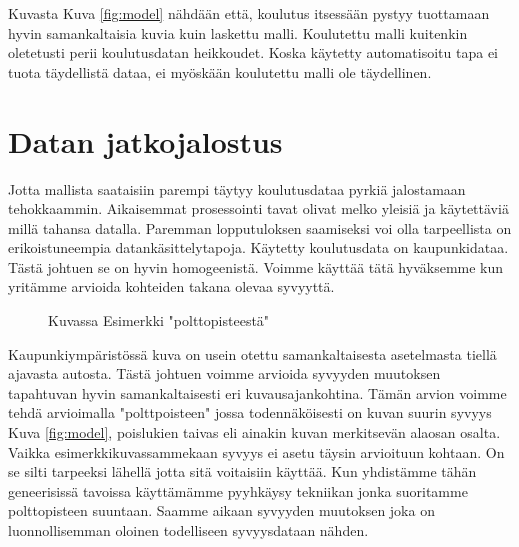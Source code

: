 Kuvasta Kuva \ref{fig:model}  nähdään että, koulutus itsessään pystyy tuottamaan hyvin samankaltaisia kuvia kuin laskettu malli. Koulutettu malli kuitenkin oletetusti perii koulutusdatan heikkoudet. Koska käytetty automatisoitu tapa ei tuota täydellistä dataa, ei myöskään koulutettu malli ole täydellinen. 


\section{Datan jatkojalostus}

Jotta mallista saataisiin parempi täytyy koulutusdataa pyrkiä jalostamaan tehokkaammin. 
Aikaisemmat prosessointi tavat olivat melko yleisiä ja käytettäviä millä tahansa datalla. Paremman lopputuloksen saamiseksi voi olla tarpeellista on erikoistuneempia datankäsittelytapoja.
Käytetty koulutusdata on kaupunkidataa. Tästä johtuen se on hyvin homogeenistä.
Voimme käyttää tätä hyväksemme kun yritämme arvioida kohteiden takana olevaa syvyyttä.

\begin{figure}[h]
\centering
{}
\caption{Kuvassa Esimerkki "polttopisteestä"}
\label{fig:polttopiste}
\end{figure}


Kaupunkiympäristössä kuva on usein otettu samankaltaisesta asetelmasta tiellä ajavasta autosta. 
Tästä johtuen voimme arvioida syvyyden muutoksen tapahtuvan hyvin samankaltaisesti eri kuvausajankohtina.
Tämän arvion voimme tehdä arvioimalla "polttpoisteen" jossa todennäköisesti on kuvan suurin syvyys Kuva \ref{fig:model},
poislukien taivas eli ainakin kuvan merkitsevän alaosan osalta. Vaikka esimerkkikuvassammekaan syvyys ei asetu täysin arvioituun kohtaan.
On se silti tarpeeksi lähellä jotta sitä voitaisiin käyttää. 
Kun yhdistämme tähän geneerisissä tavoissa käyttämämme pyyhkäysy tekniikan jonka suoritamme polttopisteen suuntaan.
Saamme aikaan syvyyden muutoksen joka on luonnollisemman oloinen todelliseen syvyysdataan nähden.


